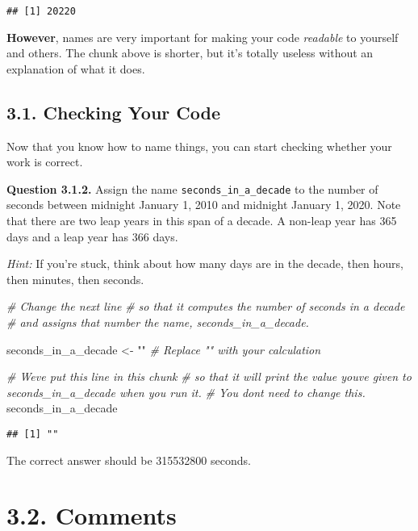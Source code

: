 \documentclass[
]{article}
\newenvironment{Shaded}{\begin{snugshade}}{\end{snugshade}}
\newcommand{\CommentTok}[1]{\textcolor[rgb]{0.56,0.35,0.01}{\textit{#1}}}
\newcommand{\NormalTok}[1]{#1}
\newcommand{\OtherTok}[1]{\textcolor[rgb]{0.56,0.35,0.01}{#1}}
\newcommand{\StringTok}[1]{\textcolor[rgb]{0.31,0.60,0.02}{#1}}
\begin{document}
\begin{verbatim}
## [1] 20220
\end{verbatim}

\textbf{However}, names are very important for making your code
\emph{readable} to yourself and others. The chunk above is shorter, but
it's totally useless without an explanation of what it does.

\subsection{3.1. Checking Your Code}\label{checking-your-code}

Now that you know how to name things, you can start checking whether
your work is correct.

\textbf{Question 3.1.2.} Assign the name \texttt{seconds\_in\_a\_decade}
to the number of seconds between midnight January 1, 2010 and midnight
January 1, 2020. Note that there are two leap years in this span of a
decade. A non-leap year has 365 days and a leap year has 366 days.

\emph{Hint:} If you're stuck, think about how many days are in the
decade, then hours, then minutes, then seconds.

\begin{Shaded}
\begin{Highlighting}[]
\CommentTok{\# Change the next line }
\CommentTok{\# so that it computes the number of seconds in a decade }
\CommentTok{\# and assigns that number the name, seconds\_in\_a\_decade.}

\NormalTok{seconds\_in\_a\_decade }\OtherTok{\textless{}{-}} \StringTok{""}  \CommentTok{\# Replace "" with your calculation}

\CommentTok{\# We\textquotesingle{}ve put this line in this chunk }
\CommentTok{\# so that it will print the value you\textquotesingle{}ve given to seconds\_in\_a\_decade when you run it.  }
\CommentTok{\# You don\textquotesingle{}t need to change this.}
\NormalTok{seconds\_in\_a\_decade}
\end{Highlighting}
\end{Shaded}

\begin{verbatim}
## [1] ""
\end{verbatim}

The correct answer should be 315532800 seconds.

\section{3.2. Comments}\label{comments}
\end{document}
